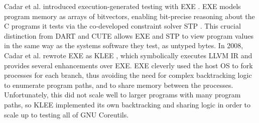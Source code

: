 Cadar et al. introduced execution-generated testing with EXE
\cite{cadar_exe:_2006}.
%
EXE models program memory as arrays of bitvectors, enabling bit-precise
reasoning about the C programs it tests via the co-developed constraint
solver STP \cite{ganesh_decision_2007}.
%
This crucial distinction from DART and CUTE allows EXE and STP to view
program values in the same way as the systems software they test, as
untyped bytes.
%
%
%
In 2008, Cadar et al. rewrote EXE as KLEE \cite{Cadar2008-kg}, which
symbolically executes LLVM IR \cite{lattner_llvm:_2004} and provides
several enhancements over EXE.
%
EXE cleverly used the host OS to fork processes for each branch,
thus avoiding the need for complex backtracking logic to enumerate
program paths, and to share memory between the processes.
%
Unfortunately, this did not scale well to larger programs with many
program paths, so KLEE implemented its own backtracking and sharing
logic in order to scale up to testing all of GNU Coreutils.
%
